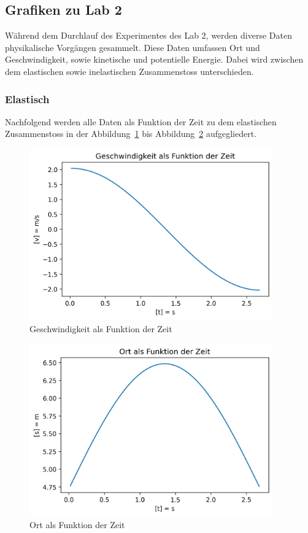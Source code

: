 \documentclass[../main.tex]{subfiles}
\begin{document}
    \subsection{Grafiken zu Lab 2}
    Während dem Durchlauf des Experimentes des Lab 2, werden diverse Daten physikalische Vorgängen
    gesammelt. Diese Daten umfassen Ort und Geschwindigkeit, sowie kinetische und potentielle Energie.
    Dabei wird zwischen dem elastischen sowie inelastischen Zusammenstoss unterschieden.
    \subsubsection{Elastisch}
    Nachfolgend werden alle Daten als Funktion der Zeit zu dem elastischen Zusammenstoss in der
    Abbildung~\ref{fig:GeschwindigkeitAlsFunktionDerZeit} bis Abbildung~\ref{fig:OrtAlsFunktionDerZeit}
    aufgegliedert.

    \begin{figure}[H]
        \begin{center}
            \centerline{\includegraphics[width=105mm]{./images/Elastisch/GeschwindigkeitAlsFunktionDerZeit}}
            \caption{Geschwindigkeit als Funktion der Zeit}
            \label{fig:GeschwindigkeitAlsFunktionDerZeit}
        \end{center}
    \end{figure}

    \begin{figure}[H]
        \begin{center}
            \centerline{\includegraphics[width=105mm]{./images/Elastisch/OrtAlsFunktionDerZeit}}
            \caption{Ort als Funktion der Zeit}
            \label{fig:OrtAlsFunktionDerZeit}
        \end{center}
    \end{figure}
\end{document}
